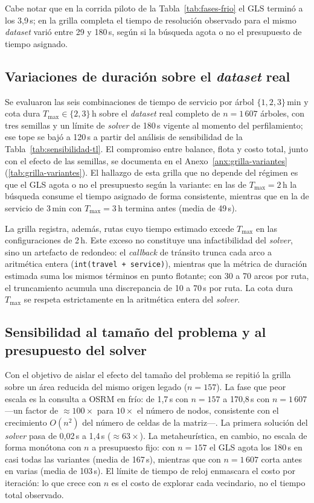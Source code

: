 Cabe notar que en la corrida piloto de la Tabla~\ref{tab:fases-frio} el GLS
terminó a los 3,9\,s; en la grilla completa el tiempo de resolución observado
para el mismo \textit{dataset} varió entre 29 y 180\,s, según si la búsqueda
agota o no el presupuesto de tiempo asignado.

\subsection{Variaciones de duración sobre el \textit{dataset} real}
\label{sec:variantes-duracion}

Se evaluaron las seis combinaciones de tiempo de servicio por árbol
$\{1, 2, 3\}$\,min y cota dura $T_{\max} \in \{2, 3\}$\,h sobre el
\textit{dataset} real completo de $n=1\,607$ árboles, con tres semillas y un
límite de \textit{solver} de 180\,s vigente al momento del perfilamiento; ese
tope se bajó a 120\,s a partir del análisis de sensibilidad de la
Tabla~\ref{tab:sensibilidad-tl}. El compromiso entre balance, flota y costo
total, junto con el efecto de las semillas, se documenta en el
Anexo~\ref{anx:grilla-variantes} (\autoref{tab:grilla-variantes}).
El hallazgo de esta grilla que no depende del régimen es que el GLS agota o no
el presupuesto según la variante: en las de $T_{\max}=2$\,h la búsqueda
consume el tiempo asignado de forma consistente, mientras que en la de
servicio de 3\,min con $T_{\max}=3$\,h termina antes
(media de 49\,s).

La grilla registra, además, rutas cuyo tiempo estimado excede $T_{\max}$
en las configuraciones de 2\,h. Este exceso no constituye una infactibilidad
del \textit{solver}, sino un artefacto de redondeo: el \textit{callback} de
tránsito trunca cada arco a aritmética entera
(\texttt{int(travel + service)}), mientras que la métrica de duración estimada
suma los mismos términos en punto flotante; con 30 a 70 arcos por ruta, el
truncamiento acumula una discrepancia de 10 a 70\,s por ruta. La cota dura
$T_{\max}$ se respeta estrictamente en la aritmética entera del \textit{solver}.

\subsection{Sensibilidad al tamaño del problema y al presupuesto del solver}

Con el objetivo de aislar el efecto del tamaño del problema se repitió la grilla sobre un
área reducida del mismo origen legado ($n=157$). La fase que peor escala es la
consulta a OSRM en frío: de 1,7\,s con $n=157$ a 170,8\,s con $n=1\,607$
---un factor de $\approx 100\times$ para $10\times$ el número de nodos,
consistente con el crecimiento $O(n^2)$ del número de celdas de la matriz---.
La primera solución del \textit{solver} pasa de 0,02\,s a 1,4\,s ($\approx 63\times$).
La metaheurística, en cambio, no escala de forma monótona con $n$ a presupuesto
fijo: con $n=157$ el GLS agota los 180\,s en casi todas las variantes (media de
167\,s), mientras que con $n=1\,607$ corta antes en varias (media de 103\,s).
El límite de tiempo de reloj enmascara el costo por iteración: lo que crece con
$n$ es el costo de explorar cada vecindario, no el tiempo total observado.

